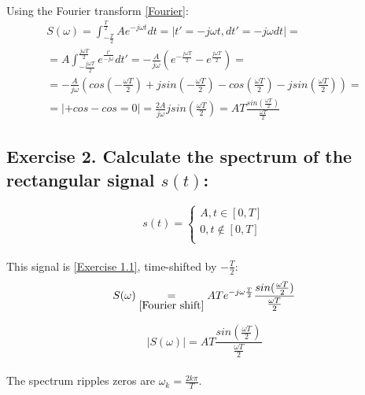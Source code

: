 \documentclass[14pt]{article}
\begin{document}
\paragraph{}
Using the Fourier transform \eqref{Fourier}:
\begin{multline} \label{Exercise 1.1 spectrum}
	S(\omega) 
	=
	\int_{-\frac{T}{2}}^{\frac{T}{2}} A e^{-j \omega t} {d}t
	=
	|t' = -j \omega t, {d}t' = -j \omega {d}t|
	=\\=
	A \int_{-\frac{j \omega T}{2}}^{\frac{j \omega T}{2}} 
		e^\frac{t'}{-j \omega} {d}t'
	=
	-\frac{A}{j \omega} (e^{-\frac{j \omega T}{2}} 
		- e^\frac{j \omega T}{2})
	=\\=
	-\frac{A}{j \omega} (cos(-\frac{\omega T}{2}) 
		+ j sin(-\frac{\omega T}{2}) - cos(\frac{\omega T}{2}) 
		- j sin(\frac{\omega T}{2}))
	=\\=
	|+cos -cos = 0|
	=
	\frac{2 A}{j \omega} j sin(\frac{\omega T}{2}) 
	=
	A T \frac{sin(\frac{\omega T}{2})}{\frac{\omega T}{2}}
\end{multline}

\subsection{Exercise 2. Calculate the spectrum of the rectangular
	signal $ s(t) $:}
\begin{equation}
	s(t) 
	=
	\left\{  
	\begin{array}{rcl}  
		A, t \in [0, T]\\  
		0, t \notin [0, T]\\  
	\end{array}
	\right.  
\end{equation} 

\paragraph{}
This signal is \eqref{Exercise 1.1}, time-shifted by 
	$ -\frac{T}{2} $:
\begin{equation}
	S(\omega) 
	\underset{\eqref{Fourier shift}}{=}
	A T e^{-j \omega \frac{T}{2}} \frac{sin(\frac{\omega T}{2})} 
		{\frac{\omega T}{2}}
\end{equation}

\begin{equation}
	|S(\omega)| 
	=
	A T \frac{sin(\frac{\omega T}{2})}{\frac{\omega T}{2}}
\end{equation}

\paragraph{}
The spectrum ripples zeros are $ \omega_k = \frac{2 k \pi}{T} $.
\end{document}
